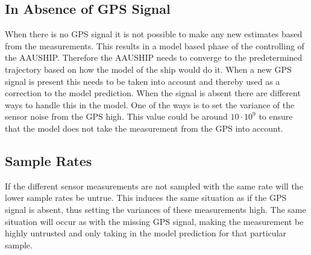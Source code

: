 \subsection{In Absence of \ac{GPS} Signal}
When there is no \ac{GPS} signal it is not possible to make any new estimates based from the measurements. This results in a model based phase of the controlling of the AAUSHIP. Therefore the AAUSHIP needs to converge to the predetermined trajectory based on how the model of the ship would do it. When a new \ac{GPS} signal is present this needs to be taken into account and thereby used as a correction to the model prediction. When the signal is absent there are different ways to handle this in the model. One of the ways is to set the variance of the sensor noise from the \ac{GPS} high. This value could be around $10 \cdot 10^9$ to ensure that the model does not take the measurement from the \ac{GPS} into account.

\subsection{Sample Rates}
If the different sensor measurements are not sampled with the same rate will the lower sample rates be untrue. This induces the same situation as if the \ac{GPS} signal is absent, thus setting the variances of these measurements high. The same situation will occur as with the missing \ac{GPS} signal, making the measurement be highly untrusted and only taking in the model prediction for that particular sample.

